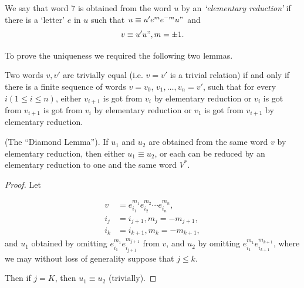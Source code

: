 We say that word $7$ is obtained from the word $u$ by an
\textit{`elementary reduction'} if there is a `letter' $e$ in $u$ such
that $u \equiv u'e^m e^{-m}u"$ and 
$$
v \equiv u' u",m= \pm 1.
$$

To prove the uniqueness we required the following two lemmas.

\begin{Lemma}%
  Two words $v,v'$ are trivially equal (i.e. $v=v'$ is a trivial
  relation) if and only if there is a finite sequence of words
  $v=v_0$, $v_1, \ldots, v_n=v'$, such that for every $i(1 \leq i \leq
  n)$, either $v_{i+1}$ is got from $v_i$ by elementary reduction or
  $v_i$ is got from $v_{i+1}$ is got from $v_i$ by  elementary
  reduction or $v_1$ is got from $v_{i+1}$ by elementary reduction. 
\end{Lemma}

\begin{Lemma}%
  (The ``Diamond Lemma''). If $u_1$ and $u_2$ are obtained from the
  same word $v$ by elementary reduction, then either $u_1 \equiv u_2$,
  or each can be reduced by an elementary reduction to one and the
  same word $V^*$.  
\end{Lemma}

\begin{proof}
  Let
  
  \noindent 
  \begin{minipage}[c]{6cm}
    \begin{align*}
      v & =e^{m_1}_{i_1}e^{m_2}_{i_2}\cdots e^{m_n}_{i_n},\\
      i_j &=i_{j+1},m_j =-m_{j+1},\\
      i_k &= i_{k+1},m_k=-m_{k+1},
    \end{align*}
    and $u_1$ obtained by omitting $e^{m_1}_{i_1}e^{m_{j+1}}_{i_{j+1}}$
    from $v$, and $u_2$ by omitting $e^{m_1}_{i_1}e^{m_{k+1}}_{i_{k+1}}$,
    where we may without loss of generality suppose that $j \leq k$.  
  \end{minipage}
  \begin{minipage}[c]{4cm}
    \begin{figure}[H]
    \end{figure}
  \end{minipage}

  Then if $j=K$, then $u_1 \equiv u_2$ (trivially).
\end{proof}

